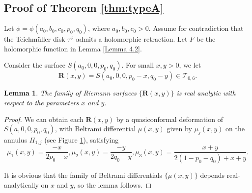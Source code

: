 \documentclass[11pt]{amsart}
\theoremstyle{plain}
\newtheorem{Lemma}[Theorem]{Lemma}
\newcommand{\Tei}{\mathcal{T}}
\newcommand{\TR}{\mathbf{R}}
\begin{document}
\subsection{Proof of Theorem \ref{thm:typeA}}\label{sec:proof}

Let $\phi=\phi(a_0,b_0,c_0,p_0,q_0)$, where $a_0,b_0,c_0>0$.
Assume for contradiction that the Teichm\"uller disk $\tau^{\phi}$ admits a holomorphic retraction.  Let $F$
be the holomorphic function in Lemma \ref{Lemma 4.2}. 

\begin{figure}
    \centering
    \caption{}
    \label{21}
\end{figure}

Consider the surface $S(a_0,0,0,p_0,q_0)$.  
  For small $x,y>0$, we let $$\mathbf{R}(x,y)=S(a_0,0,0,p_0-x,q_0-y)\in \Tei_{0,6}.$$ 
  
\begin{Lemma}\label{lemma 4.7}
The family of Riemann surfaces $\{\mathbf{R}(x,y)\}$ is real analytic with respect to the parameters $x$ and $y$.
\end{Lemma}
 \begin{proof}
    We can obtain each
 $\TR(x,y)$ by a quasiconformal deformation of $S(a,0,0,p_0,q_0)$, with Beltrami differential
$\mu(x,y)$  given by $\mu_j(x,y)$ on the annulus $\Pi_{1,j}$ (see Figure \ref{21}),
satisfying 
$$\mu_1(x,y)=\frac{-x}{2p_0-x}, \mu_2(x,y)=\frac{-y}{2q_0-y}, \mu_3(x,y)=\frac{x+y}{2(1-p_0-q_0)+x+y}.$$

 It is obvious that the family of Beltrami differentials  $\{\mu(x,y)\}$ depends real-analytically on $x$ and $y$, so the lemma follows.






 

 \end{proof}
 
\end{document}

